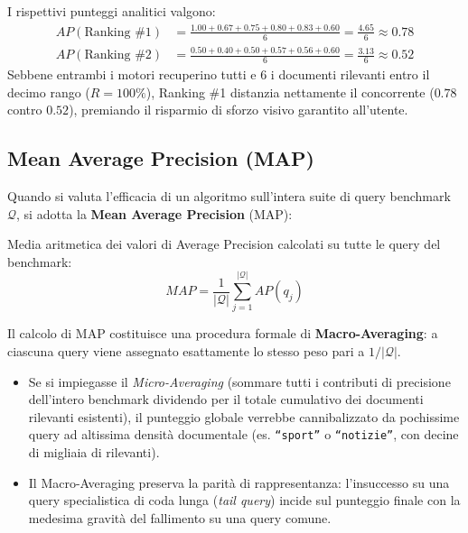 \begin{example}
I rispettivi punteggi analitici valgono:
\begin{align}
AP(\text{Ranking \#1}) &= \frac{1.00 + 0.67 + 0.75 + 0.80 + 0.83 + 0.60}{6} = \frac{4.65}{6} \approx \mathbf{0.78} \\
AP(\text{Ranking \#2}) &= \frac{0.50 + 0.40 + 0.50 + 0.57 + 0.56 + 0.60}{6} = \frac{3.13}{6} \approx \mathbf{0.52}
\end{align}
Sebbene entrambi i motori recuperino tutti e 6 i documenti rilevanti entro il decimo rango ($R=100\%$), Ranking \#1 distanzia nettamente il concorrente ($0.78$ contro $0.52$), premiando il risparmio di sforzo visivo garantito all'utente.
\end{example}

\FloatBarrier
\subsection{Mean Average Precision (MAP)}
\label{subsec:mean-average-precision-map}

Quando si valuta l'efficacia di un algoritmo sull'intera suite di query benchmark $\mathcal{Q}$, si adotta la \textbf{Mean Average Precision} (MAP):

\begin{definition}
Media aritmetica dei valori di Average Precision calcolati su tutte le query del benchmark:
\begin{equation}
MAP = \frac{1}{|\mathcal{Q}|} \sum_{j=1}^{|\mathcal{Q}|} AP(q_j)
\end{equation}
\end{definition}

\begin{property}
Il calcolo di MAP costituisce una procedura formale di \textbf{Macro-Averaging}: a ciascuna query viene assegnato esattamente lo stesso peso pari a $1/|\mathcal{Q}|$.
\begin{itemize}
    \item Se si impiegasse il \textit{Micro-Averaging} (sommare tutti i contributi di precisione dell'intero benchmark dividendo per il totale cumulativo dei documenti rilevanti esistenti), il punteggio globale verrebbe cannibalizzato da pochissime query ad altissima densit\`a documentale (es. \texttt{``sport''} o \texttt{``notizie''}, con decine di migliaia di rilevanti).
    \item Il Macro-Averaging preserva la parit\`a di rappresentanza: l'insuccesso su una query specialistica di coda lunga (\textit{tail query}) incide sul punteggio finale con la medesima gravit\`a del fallimento su una query comune.
\end{itemize}
\end{property}

